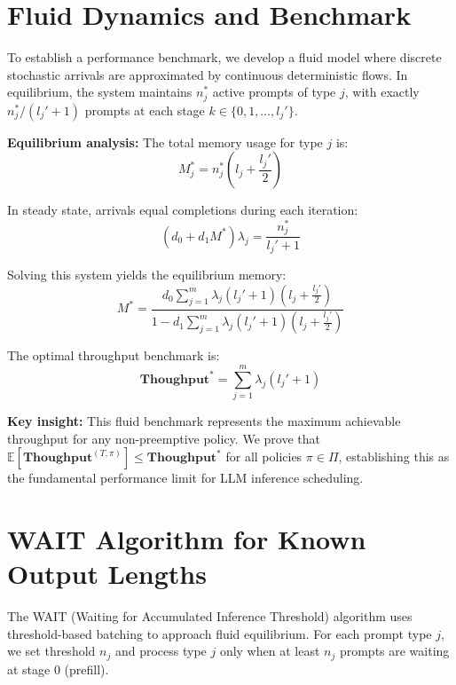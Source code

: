 \documentclass[preprint]{article}
\newcommand{\throughput}{\textbf{Thoughput}}
\theoremstyle{plain}
\theoremstyle{definition}
\theoremstyle{remark}
\begin{document}
\section{Fluid Dynamics and Benchmark}

To establish a performance benchmark, we develop a fluid model where discrete stochastic arrivals are approximated by continuous deterministic flows. In equilibrium, the system maintains $n_j^*$ active prompts of type $j$, with exactly $n_j^*/(l_j'+1)$ prompts at each stage $k \in \{0,1,\ldots,l_j'\}$.

\textbf{Equilibrium analysis:} The total memory usage for type $j$ is:
\begin{equation}
M_j^* = n_j^* \left(l_j + \frac{l_j'}{2}\right)
\end{equation}

In steady state, arrivals equal completions during each iteration:
\begin{equation}
(d_0 + d_1 M^*)\lambda_j = \frac{n_j^*}{l_j'+1}
\end{equation}

Solving this system yields the equilibrium memory:
\begin{equation}\label{eq:memory_wait}
M^* = \frac{d_0\sum_{j=1}^m \lambda_j(l_j'+1)(l_j + \frac{l_j'}{2})}{1 - d_1\sum_{j=1}^m \lambda_j(l_j'+1)(l_j + \frac{l_j'}{2})}
\end{equation}

The optimal throughput benchmark is:
\begin{equation}
\throughput^* = \sum_{j=1}^m \lambda_j(l_j'+1)
\end{equation}

\textbf{Key insight:} This fluid benchmark represents the maximum achievable throughput for any non-preemptive policy. We prove that $\mathbb{E}[\throughput^{(T,\pi)}] \leq \throughput^*$ for all policies $\pi \in \Pi$, establishing this as the fundamental performance limit for LLM inference scheduling.

\section{WAIT Algorithm for Known Output Lengths}

The WAIT (Waiting for Accumulated Inference Threshold) algorithm uses threshold-based batching to approach fluid equilibrium. For each prompt type $j$, we set threshold $n_j$ and process type $j$ only when at least $n_j$ prompts are waiting at stage 0 (prefill).
\end{document}
